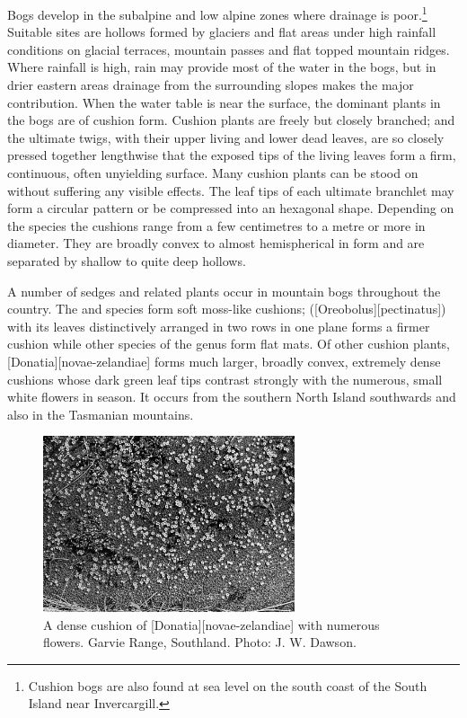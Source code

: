 Bogs develop in the subalpine and low alpine zones where drainage is poor.\footnote{Cushion bogs are also found at sea level on the south coast of the South Island near Invercargill.}
Suitable sites are hollows formed by glaciers and flat areas under high rainfall conditions on glacial terraces, mountain passes and flat topped mountain ridges.
Where rainfall is high, rain may provide most of the water in the bogs, but in drier eastern areas drainage from the surrounding slopes makes the major contribution.
When the water table is near the surface, the dominant plants in the bogs are of cushion form.
Cushion plants are freely but closely branched; and the ultimate twigs, with their upper living and lower dead leaves, are so closely pressed together lengthwise that the exposed tips of the living leaves form a firm, continuous, often unyielding surface.
Many cushion plants can be stood on without suffering any visible effects.
The leaf tips of each ultimate branchlet may form a circular pattern or be compressed into an hexagonal shape.
Depending on the species the cushions range from a few centimetres to a metre or more in diameter.
They are broadly convex to almost hemispherical in form and are separated by shallow to quite deep hollows.

A number of sedges and related plants occur in mountain bogs throughout the country.
The  and  species form soft moss-like cushions;  ([Oreobolus][pectinatus]) with its leaves distinctively arranged in two rows in one plane forms a firmer cushion while other species of the genus form flat mats.
Of other cushion plants, [Donatia][novae-zelandiae] forms much larger, broadly convex, extremely dense cushions whose dark green leaf tips contrast strongly with the numerous, small white flowers in season.
It occurs from the southern North Island southwards and also in the Tasmanian mountains.

\begin{figure}
	\includegraphics[width=0.66\textwidth]{graphics/figure104donatia.jpg}
	\centering
	\caption[\emph{Donatia novae-zelandiae}]{A dense cushion of [Donatia][novae-zelandiae] with numerous flowers.
	Garvie Range, Southland.
	Photo: J. W. Dawson.}%
	\label{fig:104donatio}
\end{figure}


